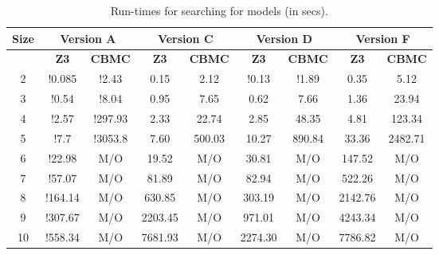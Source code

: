 \begin{table}[t]
  \centering
  \begin{tabular}[t]{|c|c|c|c|c|c|c|c|c|}\hline
    {\multirow{2}{*} \textbf{Size}}  & \multicolumn{2}{c|}{\textbf{Version A}} & \multicolumn{2}{c|}{\textbf{Version C}} & \multicolumn{2}{c|}{\textbf{Version D}}  &  \multicolumn{2}{c|}{\textbf{Version F}} \\\hline
   
   \cline{2-9}
    {} & {\textbf{Z3}} & {\textbf{CBMC}} & {\textbf{Z3}} & {\textbf{CBMC}} & {\textbf{Z3}} & {\textbf{CBMC}} & {\textbf{Z3}} & {\textbf{CBMC}} \\\hline
    
    2 & !0.085 & !2.43 & 0.15 & 2.12 & !0.13 & !1.89 & 0.35 & 5.12 \\\hline
    3 & !0.54 & !8.04 & 0.95  & 7.65 & 0.62 & 7.66  & 1.36 & 23.94\\\hline
    4 & !2.57 & !297.93 & 2.33 & 22.74 & 2.85 & 48.35  & 4.81 & 123.34\\\hline
    5 & !7.7 & !3053.8 & 7.60 & 500.03 & 10.27 & 890.84 & 33.36  & 2482.71 \\\hline
    6 & !22.98 & M/O & 19.52 & M/O & 30.81 & M/O  & 147.52 & M/O\\\hline
    7 & !57.07 & M/O & 81.89 & M/O & 82.94 & M/O & 522.26  & M/O \\\hline
    8 & !164.14 & M/O & 630.85 & M/O & 303.19 & M/O & 2142.76 & M/O\\\hline
    9 & !307.67 & M/O & 2203.45 & M/O & 971.01 & M/O & 4243.34 & M/O\\\hline
    10 & !558.34 & M/O & 7681.93 & M/O & 2274.30 & M/O & 7786.82 & M/O\\\hline
  \end{tabular}
  \caption{Run-times for searching for models (in secs).}
  \label{tab:qf-grabh}
\end{table}


